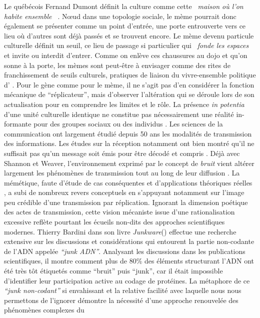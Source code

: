  Le québécois Fernand Dumont définit la culture comme cette \textit{{\guillemotleft}~maison o\`u l{\textquoteright}on habite ensemble~{\guillemotright} }\citep{Dumont1993}. N{\oe}ud dans une topologie sociale, le mème pourrait donc également se présenter comme un point d{\textquoteright}entrée, une porte entrouverte vers ce lieu o\`u d{\textquoteright}autres sont déjà passés et se trouvent encore. Le mème devenu particule culturelle définit un seuil, ce lieu de passage si particulier qui \textit{{\guillemotleft}~fonde les espaces~{\guillemotright}} \citep{Bonnin2000} et invite ou interdit d{\textquoteright}entrer. Comme on enlève ces chaussures au dojo et qu{\textquoteright}on sonne à la porte, les mèmes sont peut-être à envisager comme des rites de franchissement de seuils culturels, pratiques de liaison du vivre-ensemble politique d{\textquoteright} \cite{Arendt1995} . Pour le gène comme pour le mème, il ne s{\textquoteright}agit pas d'en considérer la fonction mécanique de {\textquotedblleft}réplicateur{\textquotedblright}, mais d{\textquoteright}observer l{\textquoteright}altération qui se déroule lors de son actualisation pour en comprendre les limites et le rôle. La présence \textit{in potentia} d{\textquoteright}une unité culturelle identique ne constitue pas nécessairement une réalité in-formante pour des groupes sociaux ou des individus \citep{Lissack2004}. Les sciences de la communication ont largement étudié depuis 50 ans les modalités de transmission des informations. Les études sur la réception notamment ont bien montré qu{\textquoteright}il ne suffisait pas qu{\textquoteright}un message soit émis pour être décodé et compris \citep{Liebes1990}. Déjà avec Shannon et Weaver, l{\textquoteright}environnement exprimé par le concept de\textit{ bruit }vient altérer largement les phénomènes de transmission tout au long de leur diffusion \citep{Attali1978}. La mémétique, faute d{\textquoteright}étude de cas conséquentes et d{\textquoteright}applications théoriques réelles \citep{Jouxtel2014}, a subi de nombreux revers conceptuels en s{\textquoteright}appuyant notamment sur l{\textquoteright}image peu crédible d{\textquoteright}une transmission par réplication. Ignorant la dimension poétique des actes de transmission, cette vision mécaniste issue d{\textquoteright}une rationalisation excessive reflète pourtant les écueils non-dits des approches scientifiques modernes. Thierry Bardini dans son livre \textit{Junkware}(\citeyear{Bardini2011}) effectue une recherche extensive sur les discussions et considérations qui entourent la partie non-codante de l{\textquoteright}ADN appelée \textit{{\textquotedblleft}junk ADN{\textquotedblright}}. Analysant les discussions dans les publications scientifiques, il montre comment plus de 80\% des éléments structurant l{\textquoteright}ADN ont été très tôt étiquetés comme {\textquotedblleft}bruit{\textquotedblright} puis {\textquotedblleft}junk{\textquotedblright}, car il était impossible d{\textquoteright}identifier leur participation active au codage de protéines. La métaphore de ce \textit{{\textquotedblleft}junk non-codant{\textquotedblright} }si envahissant et la relative facilité avec laquelle nous nous permettons de l{\textquoteright}ignorer démontre la nécessité d{\textquoteright}une approche renouvelée des phénomènes complexes du 